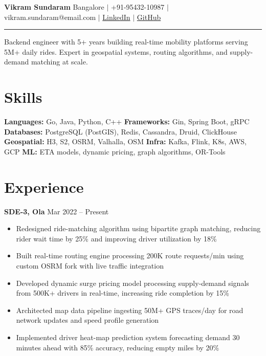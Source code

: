 \documentclass[9pt,a4paper]{article}
\begin{document}
{\normalsize\bfseries Vikram Sundaram} \hfill {\tiny Bangalore $|$ +91-95432-10987 $|$ vikram.sundaram@email.com $|$ \href{https://linkedin.com/in/vikramsundaram}{LinkedIn} $|$ \href{https://github.com/vikramsundaram}{GitHub}}

\vspace{2pt}\hrule\vspace{2pt}

{\tiny Backend engineer with 5+ years building real-time mobility platforms serving 5M+ daily rides. Expert in geospatial systems, routing algorithms, and supply-demand matching at scale.}

\section{Skills}
{\tiny\textbf{Languages:} Go, Java, Python, C++ \textbf{Frameworks:} Gin, Spring Boot, gRPC \textbf{Databases:} PostgreSQL (PostGIS), Redis, Cassandra, Druid, ClickHouse \textbf{Geospatial:} H3, S2, OSRM, Valhalla, OSM \textbf{Infra:} Kafka, Flink, K8s, AWS, GCP \textbf{ML:} ETA models, dynamic pricing, graph algorithms, OR-Tools}

\section{Experience}

{\footnotesize\bfseries SDE-3, Ola} \hfill {\tiny Mar 2022 -- Present}
\begin{itemize}
    \item Redesigned ride-matching algorithm using bipartite graph matching, reducing rider wait time by 25\% and improving driver utilization by 18\%
    \item Built real-time routing engine processing 200K route requests/min using custom OSRM fork with live traffic integration
    \item Developed dynamic surge pricing model processing supply-demand signals from 500K+ drivers in real-time, increasing ride completion by 15\%
    \item Architected map data pipeline ingesting 50M+ GPS traces/day for road network updates and speed profile generation
    \item Implemented driver heat-map prediction system forecasting demand 30 minutes ahead with 85\% accuracy, reducing empty miles by 20\%
\end{itemize}
\end{document}
